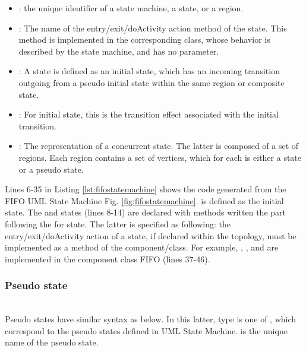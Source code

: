 \begin{itemize}
	\item {}: the unique identifier of a state machine, a state, or a region.
	
	\item {}: The name of the entry/exit/doActivity action method of the state. 
	This method is implemented in the corresponding class, whose behavior is described by the state machine, and has no parameter.
	
	\item {}: A state is defined as an initial state, which has an incoming transition outgoing from a pseudo initial state within the same region or composite state. 
	
	\item {}: For initial state, this is the transition effect associated with the initial transition.
	
	\item {}: The representation of a concurrent state. 
	The latter is composed of a set of regions.
	Each region contains a set of vertices, which for each is either a state or a pseudo state.
	
\end{itemize}


Lines 6-35 in Listing \ref{lst:fifostatemachine} shows the code generated from the FIFO UML State Machine Fig. \ref{fig:fifostatemachine}.
 is defined as the initial state. 
The  and  states (lines 8-14) are declared with methods written the  part following the  for state. The latter is specified as following: the entry/exit/doActivity action of a state, if declared within the topology, must be implemented as a method of the component/class. 
For example, , , and  are implemented in the component class FIFO (lines 37-46).

\subsubsection{Pseudo state} ~\\
\indent
{}
Pseudo states have similar syntax as below.
In this latter,  type is one of , which correspond to the pseudo states defined in UML State Machine. 
 is the unique name of the pseudo state.

